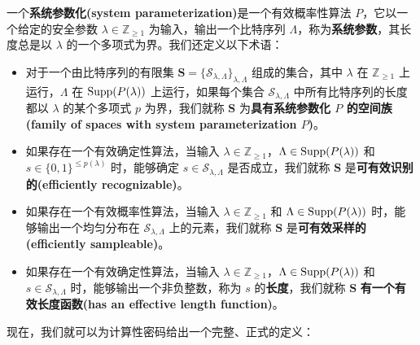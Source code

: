 \begin{definition}\label{def:2-9}
一个\textbf{系统参数化(system parameterization)}是一个有效概率性算法 $P$，它以一个给定的安全参数 $\lambda\in\mathbb{Z}_{\geq1}$ 为输入，输出一个比特序列 $\Lambda$，称为\textbf{系统参数}，其长度总是以 $\lambda$ 的一个多项式为界。我们还定义以下术语：
\begin{itemize}
	\item 对于一个由比特序列的有限集 $\mathbf{S}=\{\mathcal{S}_{\lambda,\Lambda}\}_{\lambda,\Lambda}$ 组成的集合，其中 $\lambda$ 在 $\mathbb{Z}_{\geq1}$ 上运行，$\Lambda$ 在 ${\rm Supp}(P(\lambda))$ 上运行，如果每个集合 $\mathcal{S}_{\lambda,\Lambda}$ 中所有比特序列的长度都以 $\lambda$ 的某个多项式 $p$ 为界，我们就称 $\mathbf{S}$ 为\textbf{具有系统参数化 $P$ 的空间族 (family of spaces with system parameterization $P$)}。
	\item 如果存在一个有效确定性算法，当输入 $\lambda\in\mathbb{Z}_{\geq1}$，$\Lambda\in{\rm Supp}(P(\lambda))$ 和 $s\in\{0,1\}^{\leq p(\lambda)}$ 时，能够确定 $s\in\mathcal{S}_{\lambda,\Lambda}$ 是否成立，我们就称 $\mathbf{S}$ 是\textbf{可有效识别的(efficiently recognizable)}。
	\item 如果存在一个有效概率性算法，当输入 $\lambda\in\mathbb{Z}_{\geq1}$ 和 $\Lambda\in{\rm Supp}(P(\lambda))$ 时，能够输出一个均匀分布在 $\mathcal{S}_{\lambda,\Lambda}$ 上的元素，我们就称 $\mathbf{S}$ 是\textbf{可有效采样的(efficiently sampleable)}。
	\item 如果存在一个有效确定性算法，当输入 $\lambda\in\mathbb{Z}_{\geq1}$，$\Lambda\in{\rm Supp}(P(\lambda))$ 和 $s\in\mathcal{S}_{\lambda,\Lambda}$ 时，能够输出一个非负整数，称为 $s$ 的\textbf{长度}，我们就称 $\mathbf{S}$ \textbf{有一个有效长度函数(has an effective length function)}。
\end{itemize}
\end{definition}
现在，我们就可以为计算性密码给出一个完整、正式的定义：

